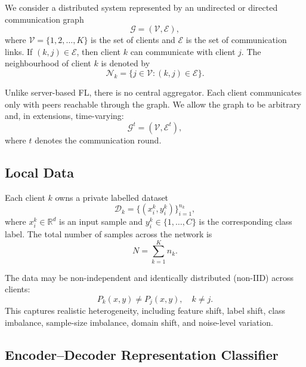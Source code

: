 \documentclass[conference]{IEEEtran}
\begin{document}
We consider a distributed system represented by an undirected or directed communication graph
\begin{equation*}
    \mathcal{G} = (\mathcal{V}, \mathcal{E}),
\end{equation*}
where \(\mathcal{V}=\{1,2,\dots,K\}\) is the set of clients and \(\mathcal{E}\) is the set of communication links. If \((k,j)\in\mathcal{E}\), then client \(k\) can communicate with client \(j\). The neighbourhood of client \(k\) is denoted by
\begin{equation*}
    \mathcal{N}_k = \{j \in \mathcal{V}: (k,j)\in\mathcal{E}\}.
\end{equation*}

Unlike server-based FL, there is no central aggregator. Each client communicates only with peers reachable through the graph. We allow the graph to be arbitrary and, in extensions, time-varying:
\begin{equation*}
    \mathcal{G}^t = (\mathcal{V}, \mathcal{E}^t),
\end{equation*}
where \(t\) denotes the communication round.

\subsection{Local Data}
\label{subsec:local-data}

Each client \(k\) owns a private labelled dataset
\begin{equation*}
    \mathcal{D}_k = \{(x_i^k,y_i^k)\}_{i=1}^{n_k},
\end{equation*}
where \(x_i^k \in \mathbb{R}^{d}\) is an input sample and \(y_i^k \in \{1,\dots,C\}\) is the corresponding class label. The total number of samples across the network is
\begin{equation*}
    N = \sum_{k=1}^{K} n_k.
\end{equation*}

The data may be non-independent and identically distributed (non-IID) across clients:
\begin{equation*}
    P_k(x,y) \neq P_j(x,y), \quad k\neq j.
\end{equation*}
This captures realistic heterogeneity, including feature shift, label shift, class imbalance, sample-size imbalance, domain shift, and noise-level variation.

\subsection{Encoder--Decoder Representation Classifier}
\label{subsec:encoder-decoder-representation-classifier}
\end{document}
